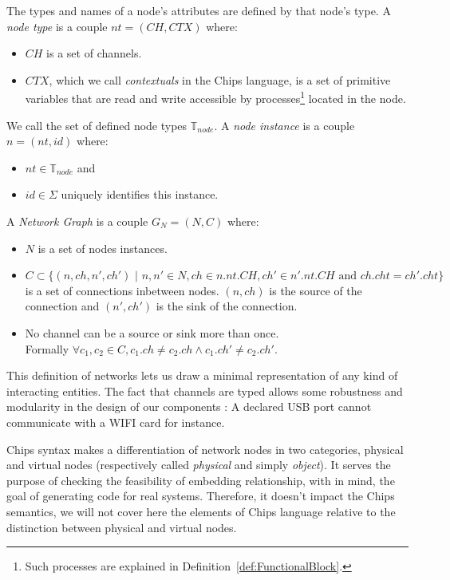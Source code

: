 \documentclass[runningheads]{llncs}
\begin{document}
\begin{definition}\label{def:Node}
    The types and names of a node's attributes are defined by that node's type. A \emph{node type} is a couple $nt = (CH, CTX)$ where:
    \begin{itemize}
        \item $CH$ is a set of channels.
        \item $CTX$, which we call \emph{contextuals} in the Chips language, is a set of primitive variables that are read and write accessible by processes\footnote{Such processes are explained in Definition~\ref{def:FunctionalBlock}.} located in the node.
    \end{itemize}
    We call the set of defined node types $\mathbb{T}_{node}$.
    A \emph{node instance} is a couple $n=(nt,id)$ where:
    \begin{itemize}
        \item $nt \in \mathbb{T}_{node}$ and
        \item $id\in\Sigma$ uniquely identifies this instance.
    \end{itemize}
\end{definition}


\begin{definition}\label{def:NetworkGraph}
    A \emph{Network Graph} is a couple $G_N = (N,C)$ where:
    \begin{itemize}
        \item $N$ is a set of nodes instances.
        \item $C \subset \{(n,ch, n', ch') \text{ | } n,n' \in N, ch \in n.nt.CH, ch' \in n'.nt.CH \text{ and } ch.cht = ch'.cht \}$ is a set of connections inbetween nodes. $(n,ch)$ is the source of the connection and $(n',ch')$ is the sink of the connection.
        \item No channel can be a source or sink more than once. \\Formally $\forall c_1,c_2 \in C, c_1.ch \neq c_2.ch \wedge c_1.ch' \neq c_2.ch'$.
    \end{itemize}
\end{definition}

This definition of networks lets us draw a minimal representation of any kind of interacting entities. The fact that channels are typed allows some robustness and modularity in the design of our components : A declared USB port cannot communicate with a WIFI card for instance.

\begin{remark}\label{rem:PhysicalVirtualDistinction}
    Chips syntax makes a differentiation of network nodes in two categories, physical and virtual nodes (respectively called \emph{physical} and simply \emph{object}). It serves the purpose of checking the feasibility of embedding relationship, with in mind, the goal of generating code for real systems. Therefore, it doesn't impact the Chips semantics, we will not cover here the elements of Chips language relative to the distinction between physical and virtual nodes.
\end{remark}
\end{document}
